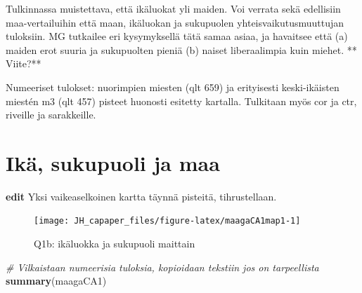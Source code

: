 \documentclass[
  finnish,
]{book}
\newenvironment{Shaded}{\begin{snugshade}}{\end{snugshade}}
\newcommand{\CommentTok}[1]{\textcolor[rgb]{0.56,0.35,0.01}{\textit{#1}}}
\newcommand{\DataTypeTok}[1]{\textcolor[rgb]{0.13,0.29,0.53}{#1}}
\newcommand{\KeywordTok}[1]{\textcolor[rgb]{0.13,0.29,0.53}{\textbf{#1}}}
\newcommand{\NormalTok}[1]{#1}
\newcommand{\StringTok}[1]{\textcolor[rgb]{0.31,0.60,0.02}{#1}}
\begin{document}
Tulkinnassa muistettava, että ikäluokat yli maiden. Voi verrata sekä
edellisiin maa-vertailuihin että maan, ikäluokan ja sukupuolen yhteisvaikutusmuuttujan
tuloksiin. MG tutkailee eri kysymyksellä tätä samaa asiaa, ja havaitsee että
(a) maiden erot suuria ja sukupuolten pieniä (b) naiset liberaalimpia kuin miehet.
** Viite?**

Numeeriset tulokset: nuorimpien miesten (qlt 659) ja erityisesti
keski-ikäisten miestén m3 (qlt 457) pisteet huonosti esitetty kartalla. Tulkitaan
myös cor ja ctr, riveille ja sarakkeille.

\hypertarget{ikuxe4-sukupuoli-ja-maa}{%
\section{Ikä, sukupuoli ja maa}\label{ikuxe4-sukupuoli-ja-maa}}

\begin{Shaded}
\end{Shaded}

\textbf{edit} Yksi vaikeaselkoinen kartta täynnä pisteitä, tihrustellaan.

\begin{figure}

{\centering \texttt{[image: JH\_capaper\_files/figure-latex/maagaCA1map1-1]} 

}

\caption{Q1b: ikäluokka ja sukupuoli maittain}\label{fig:maagaCA1map1}
\end{figure}

\begin{Shaded}
\begin{Highlighting}[]
\CommentTok{# Vilkaistaan numeerisia tuloksia, kopioidaan tekstiin jos on tarpeellista}
\KeywordTok{summary}\NormalTok{(maagaCA1)}
\end{Highlighting}
\end{Shaded}
\end{document}
